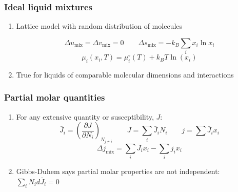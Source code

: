 \documentclass[11pt]{article}
\begin{document}
\subsubsection{Ideal liquid mixtures}
\label{sec:orgefbef72}
\begin{enumerate}
\item Lattice model with random distribution of molecules

\begin{equation*}
\Delta u_\text{mix} = \Delta v_\text{mix} = 0 \qquad \Delta s_\text{mix} = - k_B \sum_i x_i \ln x_i
\end{equation*}
\begin{equation*}
\mu_i(x_i,T) = \mu_i^\circ(T) + k_B T \ln \left ( x_i \right)
\end{equation*}

\item True for liquids of comparable molecular dimensions and interactions
\end{enumerate}
\subsubsection{Partial molar quantities}
\label{sec:orgd73e0f6}
\begin{enumerate}
\item For any extensive quantity or susceptibility, \(J\):
     \begin{equation*}
\bar{J}_i = \left ( \frac{\partial J}{\partial N_i} \right )_{N_{j\neq i}}
     \qquad J = \sum_i \bar{J}_i N_i \qquad j = \sum \bar{J}_i x_i
     \end{equation*}
\begin{equation*}
\Delta j_\text{mix} = \sum_i \bar{J}_ix_i - \sum_i j_i x_i
\end{equation*}
\item Gibbs-Duhem says partial molar properties are not independent: \(\sum_i N_i d\bar{J}_i = 0\)
\end{enumerate}
\end{document}
